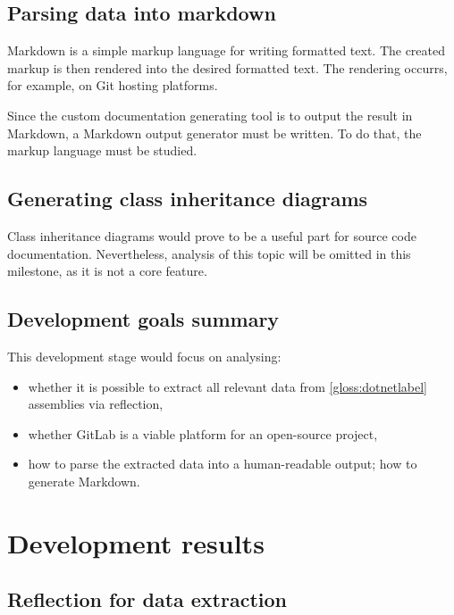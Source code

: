 \subsection{Parsing data into markdown}
Markdown is a simple markup language for writing formatted text. The created markup is then rendered into the desired formatted text. The rendering occurrs, for example, on Git hosting platforms.

Since the custom documentation generating tool is to output the result in Markdown, a Markdown output generator must be written. To do that, the markup language must be studied.

\subsection{Generating class inheritance diagrams}
Class inheritance diagrams would prove to be a useful part for source code documentation. Nevertheless, analysis of this topic will be omitted in this milestone, as it is not a core feature.

\subsection{Development goals summary}
This development stage would focus on analysing:
\begin{itemize}
    \item whether it is possible to extract all relevant data from \ref{gloss:dotnetlabel} assemblies via reflection,
    \item whether GitLab is a viable platform for an open-source project,
    \item how to parse the extracted data into a human-readable output; how to generate Markdown.
\end{itemize}

\section{Development results}

\subsection{Reflection for data extraction}

